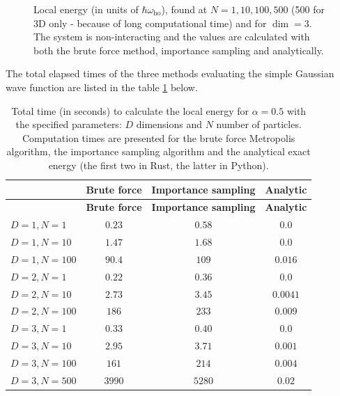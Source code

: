 \documentclass[
]{article}
\begin{document}
\begin{figure}[ht]
  \caption{Local energy (in units of $\hbar\omega_\text{ho}$), found at $N=1,10,100, 500$ (500 for 3D only - because of long computational time)  and for $\dim= 3$. The system is non-interacting and the values are calculated with both the brute force method, importance sampling and analytically.}
  \label{fig:BF_vs_IM_VS_analytical_3D}
\end{figure}

The total elapsed times of the three methods evaluating the simple
Gaussian wave function are listed in the table
\ref{tbl:BF_vs_IM_VS_analytical} below.

\begin{longtable}[]{@{}lccc@{}}
\caption{Total time (in seconds) to calculate the local energy for
\(\alpha = 0.5\) with the specified parameters: \(D\) dimensions and
\(N\) number of particles. Computation times are presented for the brute
force Metropolis algorithm, the importance sampling algorithm and the
analytical exact energy (the first two in Rust, the latter in Python).
\label{tbl:BF_vs_IM_VS_analytical}}\tabularnewline
\toprule
& \textbf{Brute force} & \textbf{Importance sampling} &
\textbf{Analytic} \\
\midrule
\endfirsthead
\toprule
& \textbf{Brute force} & \textbf{Importance sampling} &
\textbf{Analytic} \\
\midrule
\endhead
\(D=1, N=1\) & \(0.23\) & \(0.58\) & \(0.0\) \\
\(D=1, N=10\) & \(1.47\) & \(1.68\) & \(0.0\) \\
\(D=1, N=100\) & \(90.4\) & \(109\) & \(0.016\) \\
\(D=2, N=1\) & \(0.22\) & \(0.36\) & \(0.0\) \\
\(D=2, N=10\) & \(2.73\) & \(3.45\) & \(0.0041\) \\
\(D=2, N=100\) & \(186\) & \(233\) & \(0.009\) \\
\(D=3, N=1\) & \(0.33\) & \(0.40\) & \(0.0\) \\
\(D=3, N=10\) & \(2.95\) & \(3.71\) & \(0.001\) \\
\(D=3, N=100\) & \(161\) & \(214\) & \(0.004\) \\
\(D=3, N=500\) & \(3990\) & \(5280\) & \(0.02\) \\
\bottomrule
\end{longtable}
\end{document}
